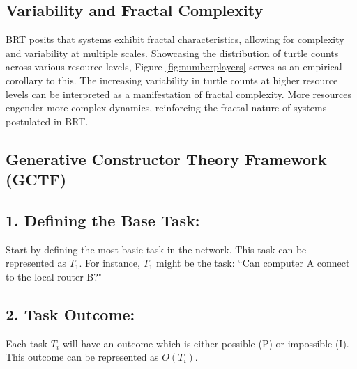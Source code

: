 \documentclass[sn-nature]{sn-jnl}%
\theoremstyle{thmstyleone}%
\theoremstyle{thmstyletwo}%
\theoremstyle{thmstylethree}%
\begin{document}

\subsection{Variability and Fractal Complexity}

BRT posits that systems exhibit fractal characteristics, allowing for complexity and variability at multiple scales. Showcasing the distribution of turtle counts across various resource levels, Figure \ref{fig:numberplayers} serves as an empirical corollary to this. The increasing variability in turtle counts at higher resource levels can be interpreted as a manifestation of fractal complexity. More resources engender more complex dynamics, reinforcing the fractal nature of systems postulated in BRT. \\




\subsection{Generative Constructor Theory Framework (GCTF)}

\subsection*{1. Defining the Base Task:}
Start by defining the most basic task in the network. This task can be represented as $T_1$.
For instance, $T_1$ might be the task: ``Can computer A connect to the local router B?"

\subsection*{2. Task Outcome:}
Each task $T_i$ will have an outcome which is either possible (P) or impossible (I). This outcome can be represented as $O(T_i)$.
\end{document}
